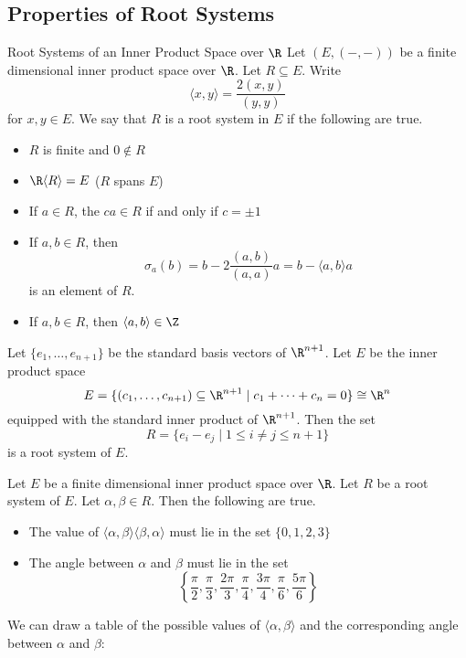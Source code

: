 \documentclass[a4paper]{article}
\begin{document}
\subsection{Properties of Root Systems}
\begin{defn}{Root Systems of an Inner Product Space over $\R$}{} Let $(E,(-,-))$ be a finite dimensional inner product space over $\R$. Let $R\subseteq E$. Write $$\langle x,y\rangle=\frac{2(x,y)}{(y,y)}$$ for $x,y\in E$. We say that $R$ is a root system in $E$ if the following are true. 
\begin{itemize}
\item $R$ is finite and $0\notin R$
\item $\R\langle R\rangle=E$ ($R$ spans $E$)
\item If $a\in R$, the $ca\in R$ if and only if $c=\pm1$
\item If $a,b\in R$, then $$\sigma_a(b)=b-2\frac{(a,b)}{(a,a)}a=b-\langle a,b\rangle a$$ is an element of $R$. 
\item If $a,b\in R$, then $\langle a,b\rangle\in\Z$
\end{itemize}
\end{defn}

\begin{eg}{}{} Let $\{e_1,\dots,e_{n+1}\}$ be the standard basis vectors of $\R^{n+1}$. Let $E$ be the inner product space $$E=\{(c_1,\dots,c_{n+1})\subseteq\R^{n+1}\;|\;c_1+\dots+c_n=0\}\cong\R^n$$ equipped with the standard inner product of $\R^{n+1}$. Then the set $$R=\{e_i-e_j\;|\;1\leq i\neq j\leq n+1\}$$ is a root system of $E$. 
\end{eg}

\begin{lmm}{}{} Let $E$ be a finite dimensional inner product space over $\R$. Let $R$ be a root system of $E$. Let $\alpha,\beta\in R$. Then the following are true. 
\begin{itemize}
\item The value of $\langle\alpha,\beta\rangle\langle\beta,\alpha\rangle$ must lie in the set $\{0,1,2,3\}$
\item The angle between $\alpha$ and $\beta$ must lie in the set $$\left\{\frac{\pi}{2},\frac{\pi}{3},\frac{2\pi}{3},\frac{\pi}{4},\frac{3\pi}{4},\frac{\pi}{6},\frac{5\pi}{6}\right\}$$
\end{itemize}
\end{lmm}

We can draw a table of the possible values of $\langle\alpha,\beta\rangle$ and the corresponding angle between $\alpha$ and $\beta$: 
\end{document}
